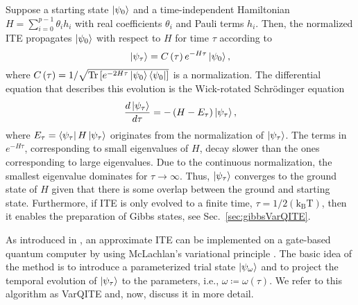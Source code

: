 \documentclass[twocolumn, aps, pra, superscriptaddress, floatfix]{revtex4}
\begin{document}
Suppose a starting state $\ket{\psi_0}$ and a time-independent Hamiltonian $H=\sum_{i=0}^{p-1}\theta_ih_i$ with real coefficients $\theta_i$ and Pauli terms $h_i$. Then, the normalized ITE propagates $\ket{\psi_0}$ with respect to $H$ for time $\tau$ according to
\begin{equation*}
\label{eq:ITE}
	\ket{\psi_\tau}=  C\left(\tau\right)e^{-H\tau}\ket{\psi_0},
\end{equation*}
where $C\left(\tau\right) = {1}/{\sqrt{\text{Tr}\left[e^{-2H\tau}\ket{\psi_0 }\bra{\psi_0}\right]}}$ is a normalization.
The differential equation that describes this evolution is the Wick-rotated Schr\"odinger equation
\begin{equation}
\label{eq:WickSchroed}
	\frac{d\ket{\psi_\tau}}{d \tau} =-\left( H - E_{\tau} \right) \ket{\psi_\tau}, 
\end{equation}
where $E_{\tau} = \bra{\psi_{\tau}} H\ket{\psi_\tau}$ originates from the normalization of $\ket{\psi_{\tau}}$.
The terms in $e^{-H\tau}$, corresponding to small eigenvalues of $H$, decay slower than the ones corresponding to large eigenvalues. Due to the continuous normalization, the smallest eigenvalue dominates for $\tau \rightarrow \infty$. Thus, $\ket{\psi_\tau}$ converges to the ground state of $H$ given that there is some overlap between the ground and starting state.
Furthermore, if ITE is only evolved to a finite time, $\tau = {1}/{2\left(\text{k}_{\text{B}}\text{T}\right)}$, then it enables the preparation of Gibbs states, see Sec.~\ref{sec:gibbsVarQITE}. 

As introduced in \cite{VarSITEMcArdle19, Simon18TheoryVarQSim}, an approximate ITE can be implemented on a gate-based quantum computer by using  McLachlan's variational principle \cite{McLachlan64}.
The basic idea of the method is to introduce a parameterized trial state $\ket{\psi_{\omega}}$ and to project the temporal evolution of $\ket{\psi_\tau}$ to the parameters, i.e.,  $\omega \coloneqq \omega(\tau)$.
We refer to this algorithm as VarQITE and, now, discuss it in more detail.
\end{document}
